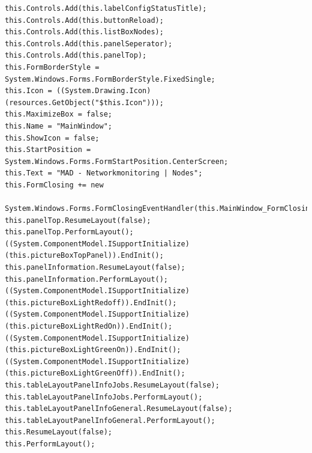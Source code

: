 \documentclass[12pt,a4paper]{report}
\begin{document}
\begin{onehalfspace}
\begin{lstlisting}
this.Controls.Add(this.labelConfigStatusTitle);
this.Controls.Add(this.buttonReload);
this.Controls.Add(this.listBoxNodes);
this.Controls.Add(this.panelSeperator);
this.Controls.Add(this.panelTop);
this.FormBorderStyle = System.Windows.Forms.FormBorderStyle.FixedSingle;
this.Icon = ((System.Drawing.Icon)(resources.GetObject("$this.Icon")));
this.MaximizeBox = false;
this.Name = "MainWindow";
this.ShowIcon = false;
this.StartPosition = System.Windows.Forms.FormStartPosition.CenterScreen;
this.Text = "MAD - Networkmonitoring | Nodes";
this.FormClosing += new
	System.Windows.Forms.FormClosingEventHandler(this.MainWindow_FormClosing);
this.panelTop.ResumeLayout(false);
this.panelTop.PerformLayout();
((System.ComponentModel.ISupportInitialize)(this.pictureBoxTopPanel)).EndInit();
this.panelInformation.ResumeLayout(false);
this.panelInformation.PerformLayout();
((System.ComponentModel.ISupportInitialize)(this.pictureBoxLightRedoff)).EndInit();
((System.ComponentModel.ISupportInitialize)(this.pictureBoxLightRedOn)).EndInit();
((System.ComponentModel.ISupportInitialize)(this.pictureBoxLightGreenOn)).EndInit();
((System.ComponentModel.ISupportInitialize)(this.pictureBoxLightGreenOff)).EndInit();
this.tableLayoutPanelInfoJobs.ResumeLayout(false);
this.tableLayoutPanelInfoJobs.PerformLayout();
this.tableLayoutPanelInfoGeneral.ResumeLayout(false);
this.tableLayoutPanelInfoGeneral.PerformLayout();
this.ResumeLayout(false);
this.PerformLayout();



\end{lstlisting}
\end{onehalfspace}
\end{document}

